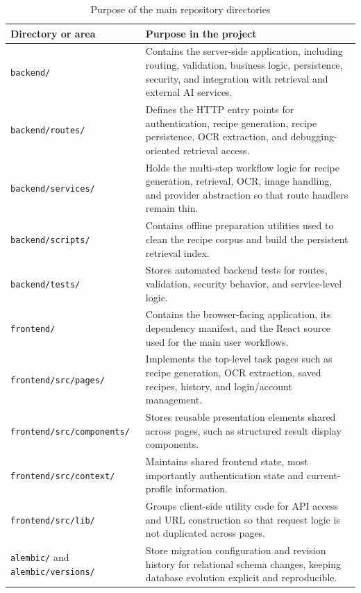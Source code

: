 \begin{table}[H]
	\centering
	\scriptsize
	\renewcommand{\arraystretch}{1.2}
	\begin{tabular}{|p{3.4cm}|p{10.5cm}|}
		\hline
		\textbf{Directory or area} & \textbf{Purpose in the project} \\
		\hline
		\texttt{backend/} & Contains the server-side application, including routing, validation, business logic, persistence, security, and integration with retrieval and external AI services. \\
		\hline
		\texttt{backend/routes/} & Defines the HTTP entry points for authentication, recipe generation, recipe persistence, OCR extraction, and debugging-oriented retrieval access. \\
		\hline
		\texttt{backend/services/} & Holds the multi-step workflow logic for recipe generation, retrieval, OCR, image handling, and provider abstraction so that route handlers remain thin. \\
		\hline
		\texttt{backend/scripts/} & Contains offline preparation utilities used to clean the recipe corpus and build the persistent retrieval index. \\
		\hline
		\texttt{backend/tests/} & Stores automated backend tests for routes, validation, security behavior, and service-level logic. \\
		\hline
		\texttt{frontend/} & Contains the browser-facing application, its dependency manifest, and the React source used for the main user workflows. \\
		\hline
		\texttt{frontend/src/pages/} & Implements the top-level task pages such as recipe generation, OCR extraction, saved recipes, history, and login/account management. \\
		\hline
		\texttt{frontend/src/components/} & Stores reusable presentation elements shared across pages, such as structured result display components. \\
		\hline
		\texttt{frontend/src/context/} & Maintains shared frontend state, most importantly authentication state and current-profile information. \\
		\hline
		\texttt{frontend/src/lib/} & Groups client-side utility code for API access and URL construction so that request logic is not duplicated across pages. \\
		\hline
		\texttt{alembic/} and \texttt{alembic/versions/} & Store migration configuration and revision history for relational schema changes, keeping database evolution explicit and reproducible. \\
		\hline
	\end{tabular}
	\caption{Purpose of the main repository directories}
	\label{tab:repo-directories}
\end{table}

